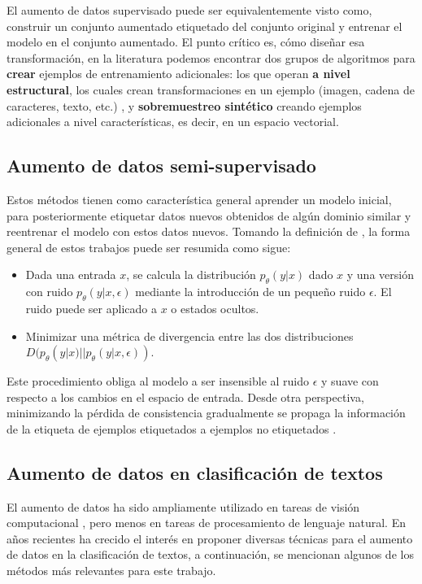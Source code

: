 El aumento de datos supervisado puede ser equivalentemente visto como, construir un conjunto aumentado etiquetado del conjunto original y entrenar el modelo en el conjunto aumentado. El punto crítico es, cómo diseñar esa transformación, en la literatura podemos encontrar dos grupos de algoritmos para \textbf{crear} ejemplos de entrenamiento adicionales: los que operan \textbf{a nivel estructural}, los cuales crean transformaciones en un ejemplo (imagen, cadena de caracteres, texto, etc.) \citep{zhong2017random}, y \textbf{sobremuestreo sintético} creando ejemplos adicionales a nivel características, es decir, en un espacio vectorial\citep{chawla2002smote}. 

\subsection{Aumento de datos semi-supervisado}

Estos métodos tienen como característica general aprender un modelo inicial, para posteriormente etiquetar datos nuevos obtenidos de algún dominio similar y reentrenar el modelo con estos datos nuevos. Tomando la definición de \citep{xie2019unsupervised}, la forma general de estos trabajos puede ser resumida como sigue:

\begin{itemize}
    \item Dada una entrada $x$, se calcula la distribución $p_\theta (y|x)$ dado $x$ y una versión con ruido $p_\theta (y|x, \epsilon)$ mediante la introducción de un pequeño ruido $\epsilon$. El ruido puede ser aplicado a $x$ o estados ocultos.
    \item Minimizar una métrica de divergencia entre las dos distribuciones $D (p_\theta (y|x) || p_\theta (y|x, \epsilon))$.
\end{itemize}

Este procedimiento  obliga al modelo a ser insensible al ruido $\epsilon$ y suave con respecto a los cambios en el espacio de entrada. Desde otra perspectiva, minimizando la pérdida de consistencia gradualmente se propaga la información de la etiqueta de ejemplos etiquetados a ejemplos no etiquetados \citep{Miyato2019}.


\subsection{Aumento de datos en clasificación de textos}

El aumento de datos ha sido ampliamente utilizado en tareas de visión computacional \citep{cubuk2019autoaugment}, pero menos en tareas de procesamiento de lenguaje natural. En años recientes ha crecido el interés en proponer diversas técnicas para el aumento de datos en la clasificación de textos, a continuación, se mencionan algunos de los métodos más relevantes para este trabajo.

